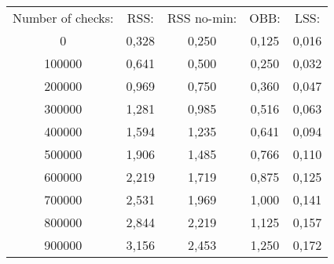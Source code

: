 \begin{tabular}{c|c|c|c|c}\\ 
Number of checks: & RSS: & RSS no-min: & OBB: & LSS:\\ 
0 & 0,328 & 0,250 & 0,125 & 0,016\\ 
100000 & 0,641 & 0,500 & 0,250 & 0,032\\ 
200000 & 0,969 & 0,750 & 0,360 & 0,047\\ 
300000 & 1,281 & 0,985 & 0,516 & 0,063\\ 
400000 & 1,594 & 1,235 & 0,641 & 0,094\\ 
500000 & 1,906 & 1,485 & 0,766 & 0,110\\ 
600000 & 2,219 & 1,719 & 0,875 & 0,125\\ 
700000 & 2,531 & 1,969 & 1,000 & 0,141\\ 
800000 & 2,844 & 2,219 & 1,125 & 0,157\\ 
900000 & 3,156 & 2,453 & 1,250 & 0,172\\ 
\end{tabular}